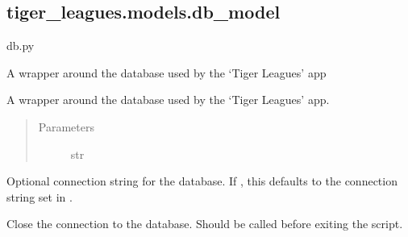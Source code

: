 \documentclass[letterpaper,10pt,english]{sphinxmanual}
\begin{document}
\subsection{tiger\_leagues.models.db\_model}
\label{\detokenize{tiger_leagues/models/readme:module-tiger_leagues.models.db_model}}\label{\detokenize{tiger_leagues/models/readme:tiger-leagues-models-db-model}}
db.py

A wrapper around the database used by the ‘Tiger Leagues’ app

\begin{fulllineitems}
\label{\detokenize{tiger_leagues/models/readme:tiger_leagues.models.db_model.Database}}
A wrapper around the database used by the ‘Tiger Leagues’ app.
\begin{quote}\begin{description}
\item[{Parameters}] \leavevmode
{} \textendash{} str

\end{description}\end{quote}

Optional connection string for the database. If , this defaults to 
the connection string set in .

\begin{fulllineitems}
\label{\detokenize{tiger_leagues/models/readme:tiger_leagues.models.db_model.Database.disconnect}}
Close the connection to the database. Should be called before exiting 
the script.

\end{fulllineitems}



\end{fulllineitems}
\end{document}
